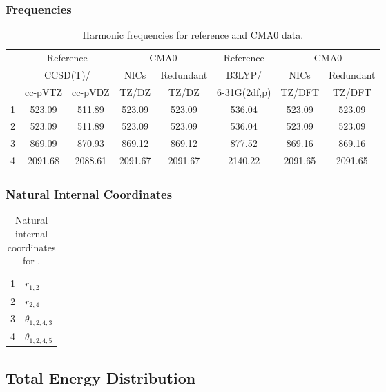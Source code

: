 \documentclass[10pt,oneside]{article}
\begin{document}
\begin{table}[h!]
\subsubsection*{Frequencies}
\centering
\caption{Harmonic frequencies for reference and CMA0 data.}
\begin{tabular}{cccccccc}
\toprule
{} & \multicolumn{2}{c}{Reference} & \multicolumn{2}{c}{CMA0} &    Reference & \multicolumn{2}{c}{CMA0} \\
{} & \multicolumn{2}{c}{CCSD(T)/} &    NICs &  Redundant &       B3LYP/ &    NICs & Redundant \\
{} &   cc-pVTZ & cc-pVDZ &   TZ/DZ &      TZ/DZ & 6-31G(2df,p) &  TZ/DFT &    TZ/DFT \\
\midrule
1 &    523.09 &  511.89 &  523.09 &     523.09 &       536.04 &  523.09 &    523.09 \\
2 &    523.09 &  511.89 &  523.09 &     523.09 &       536.04 &  523.09 &    523.09 \\
3 &    869.09 &  870.93 &  869.12 &     869.12 &       877.52 &  869.16 &    869.16 \\
4 &   2091.68 & 2088.61 & 2091.67 &    2091.67 &      2140.22 & 2091.65 &   2091.65 \\
\bottomrule
\end{tabular}
\end{table}

\begin{table}[h!]
\subsubsection*{Natural Internal Coordinates}
\centering
\caption{Natural internal coordinates for .}
\small
\begin{tabular}{ll}
\toprule
  1   & $r_{1,2}$ \\
  2   & $r_{2,4}$ \\
  3   & $\theta_{1,2,4,3}$ \\
  4   & $\theta_{1,2,4,5}$ \\
\bottomrule
\end{tabular}
\end{table}

\begin{table}
\subsection*{Total Energy Distribution}
\centering\end{table}
\end{document}
